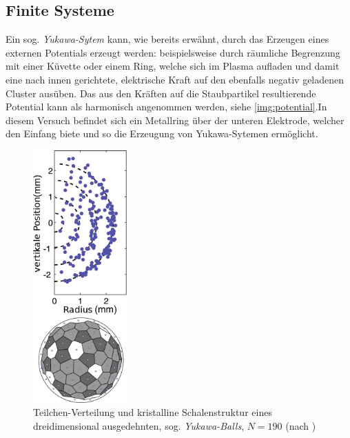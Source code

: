 \documentclass[numbers=noenddot,a4paper,notitlepage,twoside,BCOR15mm]{scrartcl}
\newcommand{\tilt}[1]{\textit{#1}}
\begin{document}
	\subsection{Finite Systeme}

		Ein sog. \tilt{Yukawa-Sytem} kann, wie bereits erwähnt, durch das Erzeugen eines externen Potentials erzeugt werden: beispielsweise durch räumliche Begrenzung mit einer Küvette oder einem Ring, welche sich im Plasma aufladen und damit eine nach innen gerichtete, elektrische Kraft auf den ebenfalls negativ geladenen Cluster ausüben. Das aus den Kräften auf die Staubpartikel resultierende Potential kann als harmonisch angenommen werden, siehe \autoref{img:potential}.In diesem Versuch befindet sich ein Metallring über der unteren Elektrode, welcher den Einfang biete und so die Erzeugung von Yukawa-Sytemen ermöglicht.

			\begin{figure}
				\centering
				\includegraphics[width=0.32\textwidth,height=0.77\textwidth]{figs/yukawaballN190.png}
				\caption{Teilchen-Verteilung und kristalline Schalenstruktur eines dreidimensional ausgedehnten, sog. \tilt{Yukawa-Balls}, $N=190$ (nach \cite{Arp04})}\label{img:strukturN190}
			\end{figure}
\end{document}
